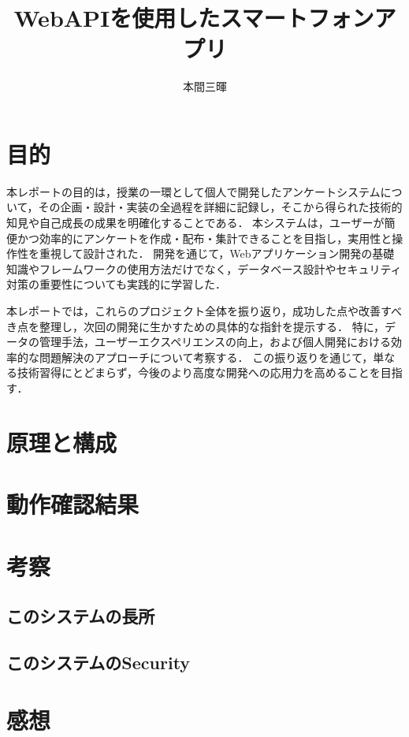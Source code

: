 \documentclass[titlepage,a4paper]{jsarticle}
\title{WebAPIを使用したスマートフォンアプリ}
\author{本間三暉}
\begin{document}
\maketitle

\section{目的}
本レポートの目的は，授業の一環として個人で開発したアンケートシステムについて，その企画・設計・実装の全過程を詳細に記録し，そこから得られた技術的知見や自己成長の成果を明確化することである．
本システムは，ユーザーが簡便かつ効率的にアンケートを作成・配布・集計できることを目指し，実用性と操作性を重視して設計された．
開発を通じて，Webアプリケーション開発の基礎知識やフレームワークの使用方法だけでなく，データベース設計やセキュリティ対策の重要性についても実践的に学習した．

本レポートでは，これらのプロジェクト全体を振り返り，成功した点や改善すべき点を整理し，次回の開発に生かすための具体的な指針を提示する．
特に，データの管理手法，ユーザーエクスペリエンスの向上，および個人開発における効率的な問題解決のアプローチについて考察する．
この振り返りを通じて，単なる技術習得にとどまらず，今後のより高度な開発への応用力を高めることを目指す．
\section{原理と構成}

\section{動作確認結果}

\section{考察}
\subsection{このシステムの長所}


\subsection{このシステムのSecurity}

\section{感想}


\begin{thebibliography}{99}
  \bibitem{}
\end{thebibliography}
\end{document}
